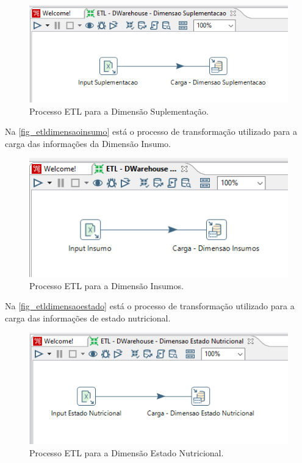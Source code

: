 \begin{figure}[htb]
	\caption{\label{fig_etldimensaosuplementacao}Processo ETL para a Dimensão Suplementação.}
	\begin{center}
	    \includegraphics[scale=0.8]{Imagens/figura - etl dw suplementacao.png}
	\end{center}
\end{figure}

\newpage
Na \autoref{fig_etldimensaoinsumo} está o processo de transformação utilizado para a carga das informações da Dimensão Insumo.

\begin{figure}[htb]
	\caption{\label{fig_etldimensaoinsumo}Processo ETL para a Dimensão Insumos.}
	\begin{center}
	    \includegraphics[scale=0.7]{Imagens/figura - etl dw insumos.png}
	\end{center}
\end{figure}

Na \autoref{fig_etldimensaoestado} está o processo de transformação utilizado para a carga das informações de estado nutricional.

\begin{figure}[htb]
	\caption{\label{fig_etldimensaoestado}Processo ETL para a Dimensão Estado Nutricional.}
	\begin{center}
	    \includegraphics[scale=0.7]{Imagens/figura - etl dw estadonutricional.png}
	\end{center}
\end{figure}

